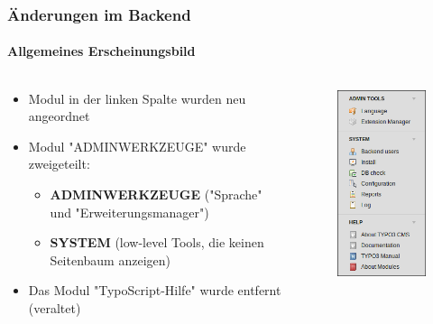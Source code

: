 
\begin{frame}[fragile]
	\frametitle{Änderungen im Backend}
	\framesubtitle{Allgemeines Erscheinungsbild}

	\begin{columns}[T]

		\begin{column}{.5\textwidth}

			\begin{itemize}
				\item Modul in der linken Spalte wurden neu angeordnet
				\item Modul "ADMINWERKZEUGE" wurde zweigeteilt:

					\begin{itemize}
						\item \textbf{ADMINWERKZEUGE} ("Sprache" und "Erweiterungsmanager")
						\item \textbf{SYSTEM} (low-level Tools, die keinen Seitenbaum anzeigen)
					\end{itemize}

				\item Das Modul "TypoScript-Hilfe" wurde entfernt (veraltet)

			\end{itemize}

		\end{column}

		\begin{column}{.5\textwidth}
			\begin{figure}\vspace*{-0.4cm}
				\includegraphics[width=0.35\linewidth]{Images/BackendChanges/AdminTools.png}
			\end{figure}
		\end{column}

	\end{columns}

\end{frame}

